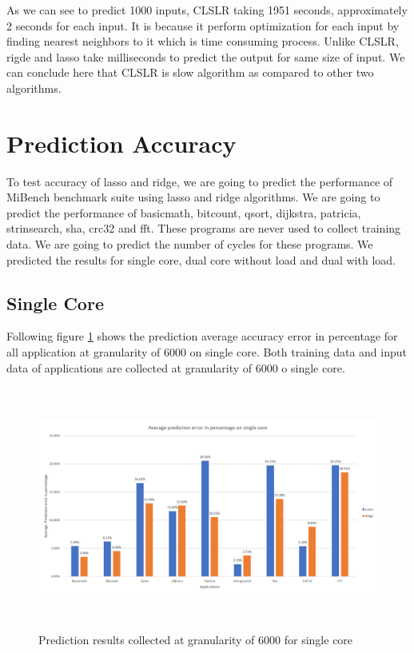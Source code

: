 As we can see to predict 1000 inputs, CLSLR taking 1951 seconds, approximately 2 seconds for each input. It is because it perform optimization for each input by finding nearest neighbors to it which is time consuming process. Unlike CLSLR, rigde and lasso take milliseconds to predict the output for same size of input. We can conclude here that CLSLR is slow algorithm as compared to other two algorithms. 

\section{Prediction Accuracy}
To test accuracy of lasso and ridge, we are going to predict the performance of MiBench benchmark suite using lasso and ridge algorithms. We are going to predict the performance of basicmath, bitcount, qsort, dijkstra, patricia, strinsearch, sha, crc32 and fft. These programs are never used to collect training data. We are going to predict the number of cycles for these programs. We predicted the results for single core, dual core without load and dual with load. 

\subsection{Single Core}
Following figure \ref{fig:r_single} shows the prediction average accuracy error in percentage for all application at granularity of 6000 on single core. Both training data and input data of applications are collected at granularity of 6000 o single core. 

\begin{figure}[h!]
\includegraphics[width=12cm, height=8cm]{./images/result_single}
\centering
\caption{Prediction results collected at granularity of 6000 for single core}
\label{fig:r_single}
\end{figure}

